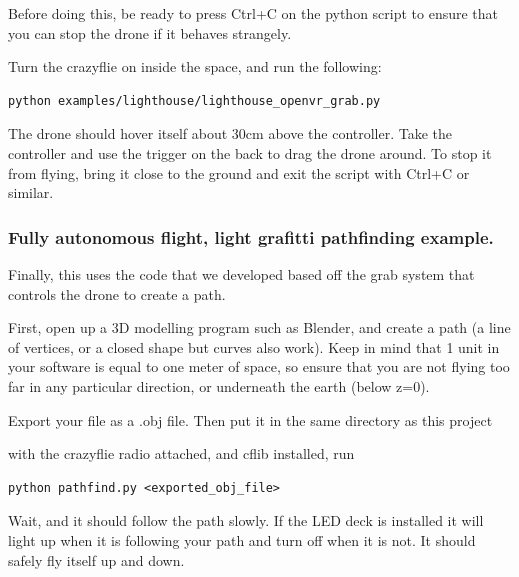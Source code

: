 Before doing this, be ready to press Ctrl+C on the python script to
ensure that you can stop the drone if it behaves strangely.

Turn the crazyflie on inside the space, and run the following:

\begin{verbatim}
python examples/lighthouse/lighthouse_openvr_grab.py
\end{verbatim}

The drone should hover itself about 30cm above the controller. Take the
controller and use the trigger on the back to drag the drone around. To
stop it from flying, bring it close to the ground and exit the script
with Ctrl+C or similar.

\hypertarget{fully-autonomous-flight-light-grafitti-pathfinding-example.}{%
\subsubsection{Fully autonomous flight, light grafitti pathfinding
example.}\label{fully-autonomous-flight-light-grafitti-pathfinding-example.}}

Finally, this uses the code that we developed based off the grab system
that controls the drone to create a path.

First, open up a 3D modelling program such as Blender, and create a path
(a line of vertices, or a closed shape but curves also work). Keep in
mind that 1 unit in your software is equal to one meter of space, so
ensure that you are not flying too far in any particular direction, or
underneath the earth (below z=0).

Export your file as a .obj file. Then put it in the same directory as
this project

with the crazyflie radio attached, and cflib installed, run

\begin{verbatim}
python pathfind.py <exported_obj_file>
\end{verbatim}

Wait, and it should follow the path slowly. If the LED deck is installed
it will light up when it is following your path and turn off when it is
not. It should safely fly itself up and down.
